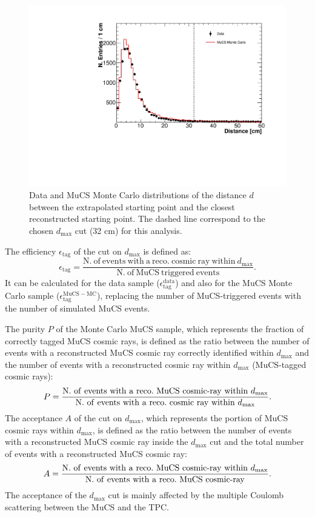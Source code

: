 \documentclass[a4paper,11pt]{article}
\def\myhyphen{{\hbox{-}}}
\begin{document}
\begin{figure}[htbp]
  \begin{center}
    \includegraphics[width=0.7\linewidth]{figures/dist.pdf}
    \caption{Data and MuCS Monte Carlo distributions of the distance $d$ between the extrapolated starting point and the closest reconstructed starting point. The dashed line correspond to the chosen $d_{\mathrm{max}}$ cut (32 cm) for this analysis.} \label{fig:dist}
  \end{center}
\end{figure}

The efficiency $\epsilon_{\mathrm{tag}}$ of the cut on $d_{\mathrm{max}}$ is defined as:
\begin{equation}
  \epsilon_{\mathrm{tag}}=\frac{\mathrm{N.~of~events~with~a~reco.~cosmic~ray~within~}d_{\mathrm{max}}}{\mathrm{N.~of~MuCS~triggered~events}}.
\end{equation}
It can be calculated for the data sample ($\epsilon^{\mathrm{data}}_{\mathrm{tag}}$) and also for the MuCS Monte Carlo sample ($\epsilon^{\mathrm{MuCS-MC}}_{\mathrm{tag}}$), replacing the number of MuCS-triggered events with the number of simulated MuCS events.

The purity $P$ of the Monte Carlo MuCS sample, which represents the fraction of correctly tagged MuCS cosmic rays, is defined as the ratio between the number of events with a reconstructed MuCS cosmic ray correctly identified within $d_{\mathrm{max}}$ and the number of events with a reconstructed cosmic ray within $d_{\mathrm{max}}$ (MuCS-tagged cosmic rays):
\begin{equation}
  P=\frac{\mathrm{N.~of~events~with~a~reco.~MuCS~cosmic\myhyphen ray~within~}d_{\mathrm{max}}}{\mathrm{N.~of~events~with~a~reco.~cosmic~ray~within~}d_{\mathrm{max}}}.
\end{equation}
The acceptance $A$ of the cut on $d_{\mathrm{max}}$, which represents the portion of MuCS cosmic rays within $d_{\mathrm{max}}$, is defined as the ratio between the number of events with a reconstructed MuCS cosmic ray inside the $d_{\mathrm{max}}$ cut and the total number of events with a reconstructed MuCS cosmic ray:
\begin{equation}
  A=\frac{\mathrm{N.~of~events~with~a~reco.~MuCS~cosmic\myhyphen ray~within~}d_{\mathrm{max}}}{\mathrm{N.~of~events~with~a~reco.~MuCS~cosmic\myhyphen ray}}.
\end{equation}
The acceptance of the $d_{\mathrm{max}}$ cut is mainly affected by the multiple Coulomb scattering between the MuCS and the TPC.
\end{document}
